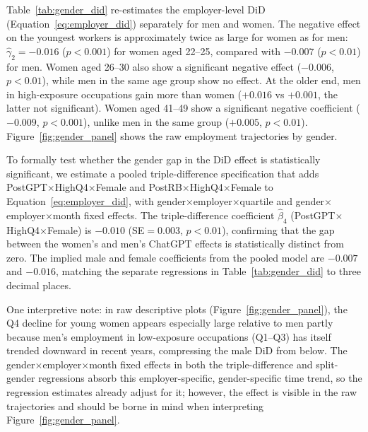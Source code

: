 \documentclass[preprint,12pt,authoryear]{elsarticle}
\begin{document}
Table~\ref{tab:gender_did} re-estimates the employer-level DiD (Equation~\ref{eq:employer_did}) separately for men and women. The negative effect on the youngest workers is approximately twice as large for women as for men: $\hat\gamma_2 = -0.016$ ($p < 0.001$) for women aged 22--25, compared with $-0.007$ ($p < 0.01$) for men. Women aged 26--30 also show a significant negative effect ($-0.006$, $p < 0.01$), while men in the same age group show no effect. At the older end, men in high-exposure occupations gain more than women ($+0.016$ vs $+0.001$, the latter not significant). Women aged 41--49 show a significant negative coefficient ($-0.009$, $p < 0.001$), unlike men in the same group ($+0.005$, $p < 0.01$). Figure~\ref{fig:gender_panel} shows the raw employment trajectories by gender.

To formally test whether the gender gap in the DiD effect is statistically significant, we estimate a pooled triple-difference specification that adds PostGPT$\times$HighQ4$\times$Female and PostRB$\times$HighQ4$\times$Female to Equation~\eqref{eq:employer_did}, with gender$\times$employer$\times$quartile and gender$\times$employer$\times$month fixed effects. The triple-difference coefficient $\hat\beta_4$ (PostGPT$\times$HighQ4$\times$Female) is $-0.010$ (SE$=0.003$, $p < 0.01$), confirming that the gap between the women's and men's ChatGPT effects is statistically distinct from zero. The implied male and female coefficients from the pooled model are $-0.007$ and $-0.016$, matching the separate regressions in Table~\ref{tab:gender_did} to three decimal places.

One interpretive note: in raw descriptive plots (Figure~\ref{fig:gender_panel}), the Q4 decline for young women appears especially large relative to men partly because men's employment in low-exposure occupations (Q1--Q3) has itself trended downward in recent years, compressing the male DiD from below. The gender$\times$employer$\times$month fixed effects in both the triple-difference and split-gender regressions absorb this employer-specific, gender-specific time trend, so the regression estimates already adjust for it; however, the effect is visible in the raw trajectories and should be borne in mind when interpreting Figure~\ref{fig:gender_panel}.
\end{document}
